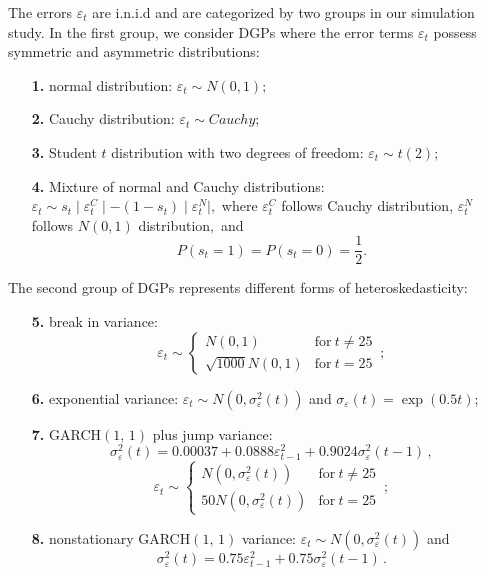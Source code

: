 \documentclass[harvard,11pt]{article}
\begin{document}
The errors $\varepsilon_t$ are i.n.i.d and are categorized by two groups in our simulation study. In the first group, we consider DGPs where the error terms $\varepsilon_t$ possess symmetric and asymmetric distributions:
\begin{enumerate}
\item[\textbf{1.}] normal distribution: $\varepsilon _{t}\sim N(0,1);$
\item[\textbf{2.}] Cauchy distribution: $\varepsilon _{t}\sim Cauchy;$
\item[\textbf{3.}] Student $t$ distribution with two degrees of freedom: $%
\varepsilon _{t}\sim t(2);$
\item[\textbf{4.}] Mixture of normal and Cauchy distributions: $%
\varepsilon _{t}\sim s_{t}\mid \varepsilon _{t}^{C}\mid -(1-s_{t})\mid
\varepsilon _{t}^{N}\mid ,$ where $\varepsilon _{t}^{C}$ follows Cauchy
distribution, $\varepsilon _{t}^{N}$ follows $N(0,1)$ distribution$,$ and 
\begin{equation*}
P\left( s_{t}=1\right) =P\left( s_{t}=0\right) =\frac{1}{2}%
.
\end{equation*}%
\end{enumerate}
The second group of DGPs represents different forms of heteroskedasticity:
\begin{enumerate}
\item[\textbf{5.}] break in variance: 
\begin{equation*}
\varepsilon _{t}\sim \left\{ 
\begin{array}{cc}
N(0,1) & \text{for}\ t\neq 25 \\ 
\sqrt{1000}N(0,1) & \text{for}\ t=25%
\end{array}%
\,;\right.
\end{equation*}%
\item[\textbf{6.}] exponential variance: $\varepsilon_{t}\sim N(0,\sigma_{\varepsilon }^{2}(t))$ and $\sigma _{\varepsilon}(t)=\exp(0.5t)$;
\item[\textbf{7.}] GARCH$(1,\,1)$ plus jump variance:%
\begin{equation*}
\sigma _{\varepsilon }^{2}(t)=0.00037+0.0888\varepsilon
_{t-1}^{2}+0.9024\sigma _{\varepsilon }^{2}(t-1)\,,
\end{equation*}%
\begin{equation*}
\varepsilon _{t}\sim \left\{ 
\begin{array}{cc}
N(0,\sigma _{\varepsilon }^{2}(t)) & \text{for}\ t\neq 25 \\ 
50N(0,\sigma _{\varepsilon }^{2}(t)) & \text{for}\ t=25%
\end{array}%
\right. \,;
\end{equation*}%
\item[\textbf{8.}] nonstationary GARCH$(1,\,1)$ variance: $\varepsilon
_{t}\sim N(0,\sigma _{\varepsilon }^{2}(t))$ and%
\begin{equation*}
\sigma _{\varepsilon }^{2}(t)=0.75\varepsilon _{t-1}^{2}+0.75\sigma
_{\varepsilon }^{2}(t-1)\,.
\end{equation*}%
\end{enumerate}
\end{document}
